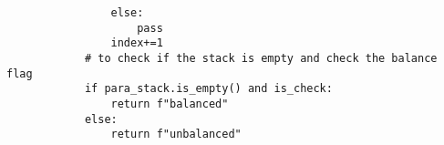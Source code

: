\documentclass{beamer}
\begin{document}
\begin{frame}[fragile]
    \begin{lstlisting}
                else:
                    pass
                index+=1
            # to check if the stack is empty and check the balance flag 
            if para_stack.is_empty() and is_check:
                return f"balanced"
            else:
                return f"unbalanced"

    \end{lstlisting}
\end{frame}
    
\end{document}
